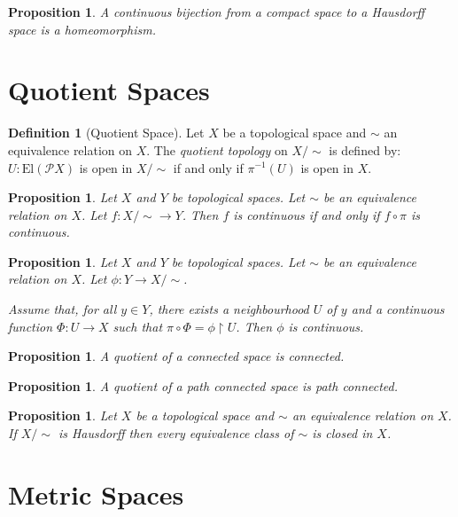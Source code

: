 \documentclass{book}
\newtheorem{prop}[ax]{Proposition}
\theoremstyle{definition}
\newtheorem{df}[ax]{Definition}
\newcommand{\El}[1]{\ensuremath{\mathrm{El} \left( {#1} \right)}}
\newcommand{\inv}[1]{\ensuremath{{#1}^{-1}}}
\begin{document}
\begin{prop}
A continuous bijection from a compact space to a Hausdorff space is a homeomorphism.
\end{prop}

\section{Quotient Spaces}

\begin{df}[Quotient Space]
Let $X$ be a topological space and $\sim$ an equivalence relation on $X$. The \emph{quotient topology} on $X / \sim$ is defined by: $U : \El{\mathcal{P} X}$ is open in $X / \sim$ if and only if $\inv{\pi}(U)$ is open in $X$.
\end{df}

\begin{prop}
Let $X$ and $Y$ be topological spaces. Let $\sim$ be an equivalence relation on $X$. Let $f : X / \sim \rightarrow Y$. Then $f$ is continuous if and only if $f \circ \pi$ is continuous.
\end{prop}

\begin{prop}
Let $X$ and $Y$ be topological spaces. Let $\sim$ be an equivalence relation on $X$. Let $\phi : Y \rightarrow X / \sim$.

Assume that, for all $y \in Y$, there exists a neighbourhood $U$ of $y$ and a continuous function $\Phi : U \rightarrow X$ such that $\pi \circ \Phi = \phi \restriction U$. Then $\phi$ is continuous.
\end{prop}

\begin{prop}
A quotient of a connected space is connected.
\end{prop}

\begin{prop}
A quotient of a path connected space is path connected.
\end{prop}

\begin{prop}
Let $X$ be a topological space and $\sim$ an equivalence relation on $X$. If $X / \sim$ is Hausdorff then every equivalence class of $\sim$ is closed in $X$.
\end{prop}

\section{Metric Spaces}
\end{document}

